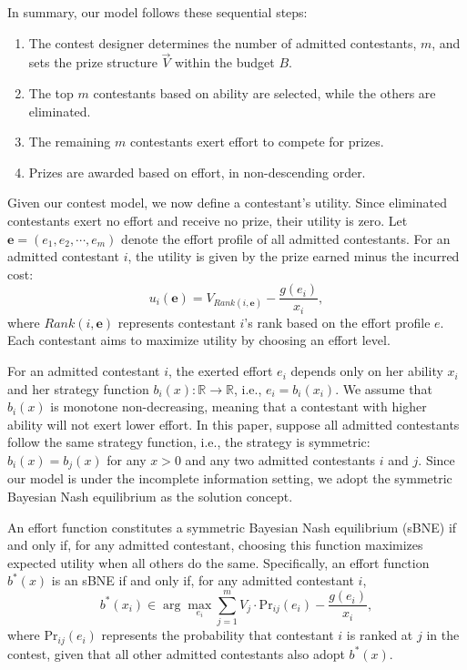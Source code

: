 In summary, our model follows these sequential steps:
\begin{enumerate}
    \item The contest designer determines the number of admitted contestants, $m$, and sets the prize structure $\vec{V}$ within the budget $B$.
    \item The top $m$ contestants based on ability are selected, while the others are eliminated.
    \item The remaining $m$ contestants exert effort to compete for prizes.
    \item Prizes are awarded based on effort, in non-descending order.
\end{enumerate}

Given our contest model, we now define a contestant's utility. Since eliminated contestants exert no effort and receive no prize, their utility is zero.
Let $\mathbf{e}= (e_1, e_2,\cdots, e_m)$ denote the effort profile of all admitted contestants. For an admitted contestant $i$, the utility is given by the prize earned minus the incurred cost:
$$
    u_i(\mathbf{e}) = V_{Rank(i,\mathbf{e})}-\frac{g(e_i)}{x_i},
$$
where $Rank(i,\mathbf{e})$ represents contestant $i$'s rank based on the effort profile $e$. Each contestant aims to maximize utility by choosing an effort level.

For an admitted contestant $i$, the exerted effort $e_i$ depends only on her ability $x_i$ and her strategy function $b_i(x): \mathbb{R} \rightarrow \mathbb{R}$, i.e., $e_i=b_i(x_i)$. We assume that $b_i(x)$ is monotone non-decreasing, meaning that a contestant with higher ability will not exert lower effort.
In this paper, suppose all admitted contestants follow the same strategy function, i.e., the strategy is symmetric: $b_i(x)=b_j(x)$ for any $x>0$ and any two admitted contestants $i$ and $j$. Since our model is under the incomplete information setting, we adopt the symmetric Bayesian Nash equilibrium as the solution concept. 
\begin{definition}\label{def:sBNE}
    An effort function constitutes a symmetric Bayesian Nash equilibrium (sBNE) if and only if, for any admitted contestant, choosing this function maximizes expected utility when all others do the same. Specifically, an effort function $b^*(x)$ is an sBNE if and only if, for any admitted contestant $i$,
$$
    b^*(x_i) \in \arg\max_{e_i} \sum_{j=1}^m V_j \cdot \text{Pr}_{ij}(e_i) -\frac{g(e_i)}{x_i},
$$
    where $\text{Pr}_{ij}(e_i)$ represents the probability that contestant $i$ is ranked at $j$ in the contest, given that all other admitted contestants also adopt $b^*(x)$. 
\end{definition}

